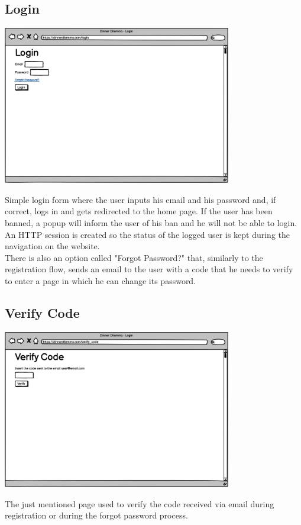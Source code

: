 \subsection{Login}
\includegraphics[width=0.75\textwidth]{images/login.png}

Simple login form where the user inputs his email and his password and, if correct, logs in and gets redirected to the home page. If the user has been banned, a popup will inform the user of his ban and he will not be able to login.\\
 An HTTP session is created so the status of the logged user is kept during the navigation on the website.\\
 There is also an option called "Forgot Password?" that, similarly to the registration flow, sends an email to the user with a code that he needs to verify to enter a page in which he can change its password.

\subsection{Verify Code}
\includegraphics[width=0.75\textwidth]{images/verifycode.png}

The just mentioned page used to verify the code received via email during registration or during the forgot password process.

